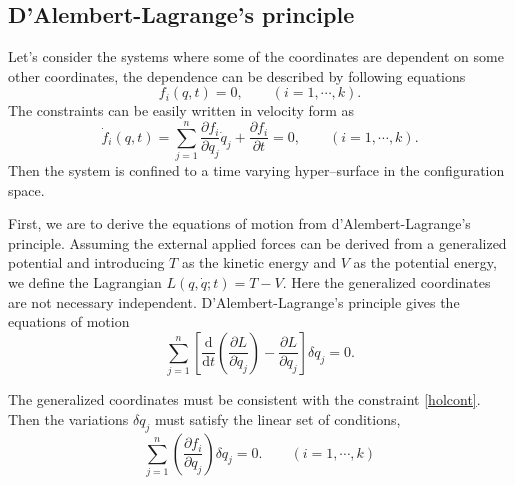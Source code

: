 \documentclass[preprint,11pt]{elsarticle}
\newcommand{\mathd}{\mathrm{d}}
\begin{document}
\subsection{D'Alembert-Lagrange's principle}
Let's consider the systems where some of the coordinates are dependent on some other coordinates, the dependence can be described by following equations
\begin{equation}
  f_i  ( q, t) = 0 , \hspace{2em} ( i = 1, \cdots , k).
  \label{holcont}
\end{equation}
The constraints can be easily written in velocity form as
\begin{equation}
\dot{f}_i ( q, t) = \sum^n_{j = 1} \frac{\partial f_i}{\partial q_j}
   \dot{q}_j + \frac{\partial f_i}{\partial t} = 0, \hspace{2em} ( i = 1, \cdots,
   k) .
\end{equation}
Then the system is confined to a time varying hyper--surface in the configuration space.

First, we are to derive the equations of motion from d'Alembert-Lagrange's principle.
Assuming the external applied forces can be derived from a generalized potential and introducing $T$ as the kinetic energy and $V$ as the potential energy, we define the Lagrangian $L(q,\dot{q};t)=T-V$.
Here the generalized coordinates are not necessary independent.
D'Alembert-Lagrange's principle gives the equations of motion
\begin{equation}
  \sum_{j = 1}^n \left[ \frac{\mathd}{\mathd t} \left( \frac{\partial
  L}{\partial \dot{q}_j} \right) - \frac{\partial L}{\partial q_j}  \right]
  \delta q_j = 0 .\label{eulerlagrange}
\end{equation}

The generalized coordinates must be consistent with the constraint \eqref{holcont}.
Then the variations $\delta q_j$ must satisfy the linear set of conditions,
\begin{equation}
  \sum_{j = 1}^n \left( \frac{\partial f_i}{\partial q_j} \right) \delta q_j =
  0. \hspace{2em} ( i = 1, \cdots, k)\label{holcontvar}
\end{equation}
\end{document}
